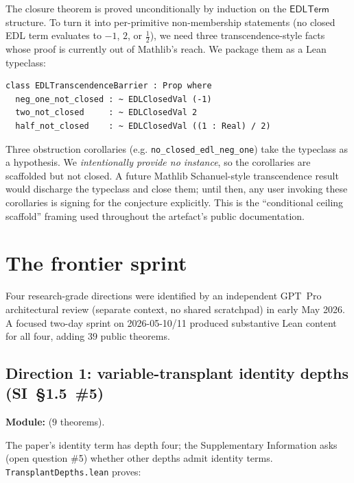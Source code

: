 \documentclass[11pt,a4paper]{article}
\theoremstyle{plain}
\theoremstyle{definition}
\newcommand{\EDLT}{\mathsf{EDLTerm}}
\begin{document}
\noindent
The closure theorem is proved unconditionally by induction on the
$\EDLT$ structure. To turn it into per-primitive non-membership
statements (no closed EDL term evaluates to $-1$, $2$, or $\frac{1}{2}$),
we need three transcendence-style facts whose proof is currently
out of Mathlib's reach. We package them as a Lean typeclass:

\begin{lstlisting}[language=Lean]
class EDLTranscendenceBarrier : Prop where
  neg_one_not_closed : ~ EDLClosedVal (-1)
  two_not_closed     : ~ EDLClosedVal 2
  half_not_closed    : ~ EDLClosedVal ((1 : Real) / 2)
\end{lstlisting}

\noindent
Three obstruction corollaries (e.g. \texttt{no\_closed\_edl\_neg\_one})
take the typeclass as a hypothesis. We \emph{intentionally provide no
instance}, so the corollaries are scaffolded but not closed. A future
Mathlib Schanuel-style transcendence result would discharge the
typeclass and close them; until then, any user invoking these
corollaries is signing for the conjecture explicitly. This is the
``conditional ceiling scaffold'' framing used throughout the
artefact's public documentation.

\section{The frontier sprint}\label{sec:frontier}

Four research-grade directions were identified by an independent
GPT~Pro architectural review (separate context, no shared scratchpad)
in early May 2026. A focused two-day sprint on 2026-05-10/11 produced
substantive Lean content for all four, adding $39$ public theorems.

\subsection{Direction 1: variable-transplant identity depths
(SI~§1.5~\#5)}

\noindent\textbf{Module:} 
($9$ theorems).

The paper's identity term has depth four; the Supplementary Information
asks (open question \#5) whether other depths admit identity terms.
\texttt{TransplantDepths.lean} proves:
\end{document}
